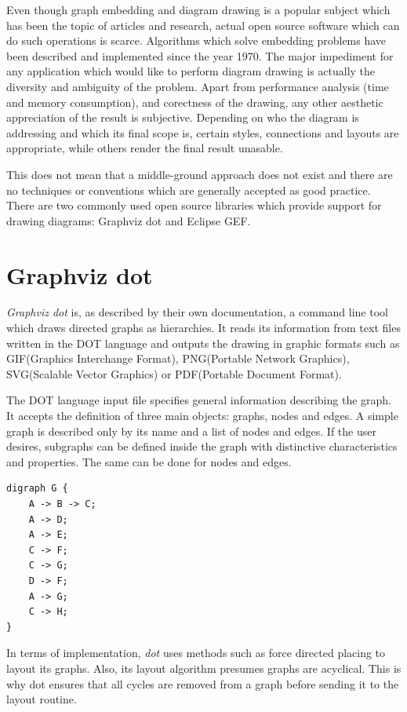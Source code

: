 Even though graph embedding and diagram drawing is a popular subject which has been the topic of articles and research, 
actual open source software which can do such operations is scarce. Algorithms which solve embedding problems have been 
described and implemented since the year 1970. The major impediment for any application which would like to perform 
diagram drawing is actually the diversity and ambiguity of the problem. Apart from performance analysis (time and 
memory consumption), and corectness of the drawing, any other aesthetic appreciation of the result is subjective.
Depending on who the diagram is addressing and which its final scope is, certain styles, connections and layouts are 
appropriate, while others render the final result unasable.

This does not mean that a middle-ground approach does not exist and there are no techniques or conventions which are 
generally accepted as good practice. There are two commonly used open source libraries which provide support for 
drawing diagrams: Graphviz dot\cite{graphvizrelwork} and Eclipse GEF\cite{eclipsegefrelwork}.

\section{Graphviz dot}

\emph{Graphviz dot} is, as described by their own documentation, a command line tool which draws directed graphs as 
hierarchies. It reads its information from text files written in the DOT language and outputs the drawing in 
graphic formats such as GIF(Graphics Interchange Format), PNG(Portable Network Graphics), SVG(Scalable Vector 
Graphics) or PDF(Portable Document Format).

The DOT language input file specifies general information describing the graph. It accepts the definition of three 
main objects: graphs, nodes and edges. A simple graph is described only by its name and a list of nodes and edges.
If the user desires, subgraphs can be defined inside the graph with distinctive characteristics and properties. 
The same can be done for nodes and edges.

\begin{lstlisting}[caption={Simple dot file format}]
digraph G {
	A -> B -> C;
	A -> D;
	A -> E;
	C -> F;
	C -> G;
	D -> F;
	A -> G;
	C -> H;
}
\end{lstlisting}

In terms of implementation, \emph{dot} uses methods such as force directed placing to layout its graphs. Also, its 
layout algorithm presumes graphs are acyclical. This is why dot ensures that all cycles are removed from a graph 
before sending it to the layout routine. 

